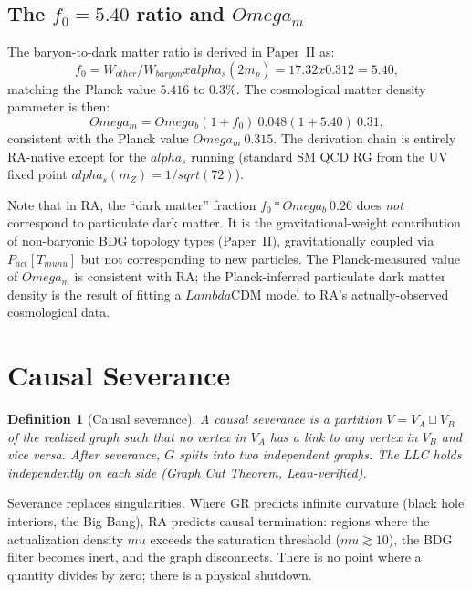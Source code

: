 \documentclass[11pt]{article}
\def\Lambda{Lambda}%
\def\Omega{Omega}%
\def\mu{mu}%
\def\alpha{alpha}%
\def\nu{nu}%
\def\mathrm#1{#1}%
\def\sqrt#1{sqrt(#1)}%
\def\frac#1#2{#1/#2}%
\def\cdot{*}%
\def\times{x}%
\def\approx{~}%
\newtheorem{definition}{Definition}
\begin{document}
\subsection{The $f_0 = 5.40$ ratio and $\Omega_m$}

The baryon-to-dark matter ratio is derived in Paper~II as:
\begin{equation}
f_0 = \frac{W_{\mathrm{other}}}{W_{\mathrm{baryon}}} \times \alpha_s(2m_p) = 17.32 \times 0.312 = 5.40,
\end{equation}
matching the Planck value $5.416$ to $0.3\%$. The cosmological matter density parameter is then:
\begin{equation}
\Omega_m = \Omega_b(1 + f_0) \approx 0.048(1 + 5.40) \approx 0.31,
\end{equation}
consistent with the Planck value $\Omega_m \approx 0.315$. The derivation chain is entirely RA-native except for the $\alpha_s$ running (standard SM QCD RG from the UV fixed point $\alpha_s(m_Z) = 1/\sqrt{72}$).

Note that in RA, the ``dark matter'' fraction $f_0 \cdot \Omega_b \approx 0.26$ does \emph{not} correspond to particulate dark matter. It is the gravitational-weight contribution of non-baryonic BDG topology types (Paper~II), gravitationally coupled via $P_{\mathrm{act}}[T_{\mu\nu}]$ but not corresponding to new particles. The Planck-measured value of $\Omega_m$ is consistent with RA; the Planck-inferred particulate dark matter density is the result of fitting a $\Lambda$CDM model to RA's actually-observed cosmological data.

\section{Causal Severance}
\label{sec:severance}

\begin{definition}[Causal severance]
A causal severance is a partition $V=V_A\sqcup V_B$ of the realized graph such that no vertex in $V_A$ has a link to any vertex in $V_B$ and vice versa. After severance, $G$ splits into two independent graphs. The LLC holds independently on each side (Graph Cut Theorem, Lean-verified).
\end{definition}

Severance replaces singularities. Where GR predicts infinite curvature (black hole interiors, the Big Bang), RA predicts causal termination: regions where the actualization density $\mu$ exceeds the saturation threshold ($\mu\gtrsim 10$), the BDG filter becomes inert, and the graph disconnects. There is no point where a quantity divides by zero; there is a physical shutdown.
\end{document}
